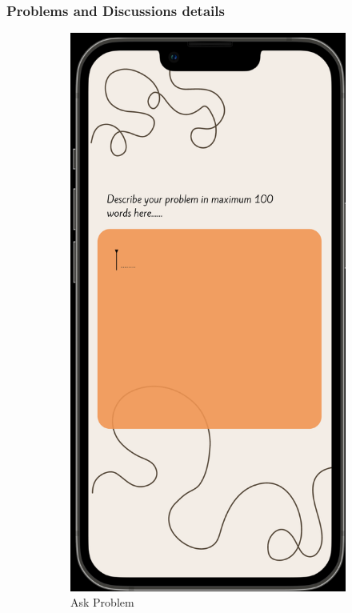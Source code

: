 \subsubsection{Problems and Discussions details}
\begin{figure}[ht] 
  \begin{subfigure}[b]{0.6\linewidth}
    \centering
    \includegraphics[width=0.6\linewidth]{figures/askproblem.png}
    \caption{Ask Problem} 
    \label{fig:a} 
    \vspace{4ex}
  \end{subfigure}%
  \begin{subfigure}[b]{0.6\linewidth}
    \centering

\end{subfigure}
\end{figure}

